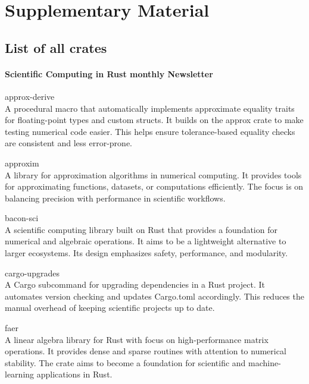\documentclass{article}
\begin{document}
\onecolumn
\printbibliography

\pagebreak
{}
\renewcommand{\thesubsection}{S\arabic{supplementSection}}
\newcommand{\supplement}[1]{%
    \stepcounter{supplementSection}%
    \subsection{#1}
}
\renewcommand{\thesection}{}

\section{Supplementary Material}
\supplement{List of all crates}

\paragraph{Scientific Computing in Rust monthly Newsletter}

approx-derive\\
A procedural macro that automatically implements approximate equality traits for
floating-point types and custom structs. It builds on the approx crate to make testing numerical
code easier. This helps ensure tolerance-based equality checks are consistent and less error-prone.

approxim\\
A library for approximation algorithms in numerical computing. It provides tools for
approximating functions, datasets, or computations efficiently. The focus is on balancing precision
with performance in scientific workflows.

bacon-sci\\
A scientific computing library built on Rust that provides a foundation for numerical
and algebraic operations. It aims to be a lightweight alternative to larger ecosystems. Its design
emphasizes safety, performance, and modularity.

cargo-upgrades\\
A Cargo subcommand for upgrading dependencies in a Rust project. It automates
version checking and updates Cargo.toml accordingly. This reduces the manual overhead of keeping
scientific projects up to date.

faer\\
A linear algebra library for Rust with focus on high-performance matrix operations. It
provides dense and sparse routines with attention to numerical stability. The crate aims to become
a foundation for scientific and machine-learning applications in Rust.
\end{document}

